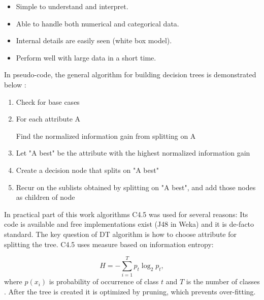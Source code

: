 \begin{itemize}
\item Simple to understand and interpret.
\item Able to handle both numerical and categorical data.
\item Internal details are easily seen (white box model).
\item Perform well with large data in a short time.
\end{itemize}

\noindent In pseudo-code, the general algorithm for building decision
trees is demonstrated below \citep{kotsiantis2007supervised}:
\begin{enumerate}
\item Check for base cases
\item For each attribute A


  \hspace{1cm} Find the normalized information gain from splitting on A
\item Let "A best" be the attribute with the highest normalized information gain
\item Create a decision node that splits on "{A best}"
\item Recur on the sublists obtained by splitting on "{A best}",
  and add those nodes as children of node
\end{enumerate}

In practical part of this work algorithms C4.5 was used for several
reasons: Its code is available and free implementations exist (J48 in
Weka) and it is de-facto standard. The key question of DT algorithm is
how to choose attribute for splitting the tree. C4.5 uses measure
based on information entropy:

\begin{equation}
  \label{eq:entropy}
  H = -\sum_{i=1}^T {p_t \log_2 p_t},
\end{equation}
where $p(x_i)$ is probability of occurrence of class $t$ and $T$ is
the number of classes \citep{berka2003dobyvani}. After the tree is
created it is optimized by pruning, which prevents over-fitting.

